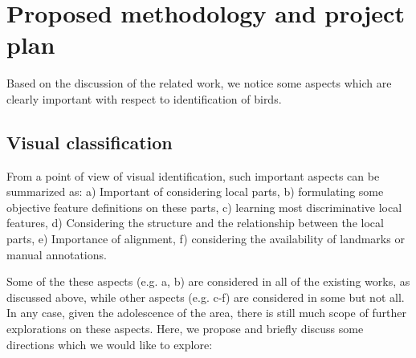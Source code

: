 \documentclass{article}
\begin{document}
\section{Proposed methodology and project plan}

Based on the discussion of the related work, we notice some aspects which are
clearly important with respect to identification of birds.

\subsection{Visual classification}
\label{subsec:visual}

From a point of view of visual identification, such important aspects can be summarized as: a)
Important of considering local parts, b) formulating some objective feature
definitions on these parts, c) learning most discriminative local features, d)
Considering the structure and the relationship between the local parts, e)
Importance of alignment, f) considering the availability of landmarks or manual
annotations. 

Some of the these aspects (e.g. a, b) are considered  in all of the existing
works, as discussed above, while other aspects (e.g. c-f)  are considered in
some but not all. In any case, given the adolescence of the area, there is still
much scope of further explorations on these aspects. Here, we propose and
briefly discuss some directions which we would like to explore: 
\end{document}
